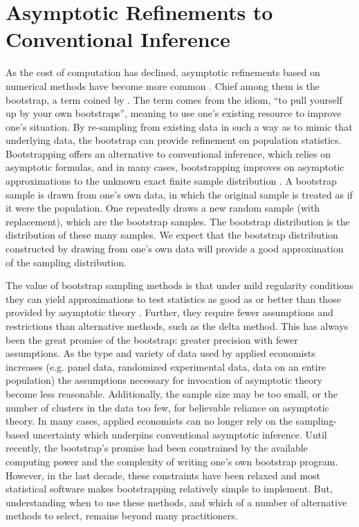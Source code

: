 \documentclass[11pt]{article}
\begin{document}

\section{Asymptotic Refinements to Conventional Inference}

As the cost of computation has declined, asymptotic refinements based on numerical methods have become more common \citep{mackinnon_bootstrap_2006}. Chief among them is the bootstrap, a term coined by \cite{efron_bootstrap_1979, efron_jackknife_1982}. The term comes from the idiom, ``to pull yourself up by your own bootstraps'', meaning to use one’s existing resource to improve one's situation. By re-sampling from existing data in such a way as to mimic that underlying data, the bootstrap can provide refinement on population statistics. Bootstrapping offers an alternative to conventional inference, which relies on asymptotic formulas, and in many cases, bootstrapping improves on asymptotic approximations to the unknown exact finite sample distribution \citep{horowitz_bootstrap_2019}. A bootstrap sample is drawn from one’s own data, in which the original sample is treated as if it were the population. One repeatedly draws a new random sample (with replacement), which are the bootstrap samples. The bootstrap distribution is the distribution of these many samples. We expect that the bootstrap distribution constructed by drawing from one’s own data will provide a good approximation of the sampling distribution.

The value of bootstrap sampling methods is that under mild regularity conditions they can yield approximations to test statistics as good as or better than those provided by asymptotic theory \citep{davidson_bootstrap_2006}. Further, they require fewer assumptions and restrictions than alternative methods, such as the delta method. This has always been the great promise of the bootstrap: greater precision with fewer assumptions. As the type and variety of data used by applied economists increases (e.g. panel data, randomized experimental data, data on an entire population) the assumptions necessary for invocation of asymptotic theory become less reasonable. Additionally, the sample size may be too small, or the number of clusters in the data too few, for believable reliance on asymptotic theory. In many cases, applied economists can no longer rely on the sampling-based uncertainty which underpins conventional asymptotic inference. Until recently, the bootstrap’s promise had been constrained by the available computing power and the complexity of writing one’s own bootstrap program. However, in the last decade, these constraints have been relaxed and most statistical software makes bootstrapping relatively simple to implement. But, understanding when to use these methods, and which of a number of alternative methods to select, remains beyond many practitioners.
\end{document}
